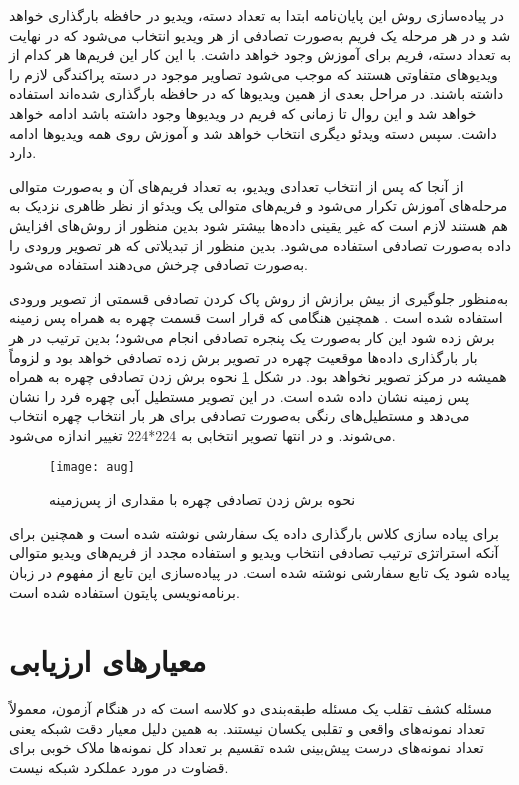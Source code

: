 در پیاده‌سازی روش این پایان‌نامه ابتدا به تعداد دسته، ویدیو در حافظه  بارگذاری خواهد شد و در هر مرحله یک فریم به‌صورت تصادفی از هر ویدیو انتخاب می‌شود که در نهایت به تعداد دسته، فریم برای آموزش وجود خواهد داشت. با این کار این فریم‌ها هر کدام از ویدیوهای متفاوتی هستند که موجب می‌شود تصاویر موجود در دسته پراکندگی لازم را داشته باشند. در مراحل بعدی از همین ویدیوها که در حافظه  بارگذاری شده‌اند استفاده خواهد شد و این روال تا زمانی که فریم در ویدیوها وجود داشته باشد ادامه خواهد داشت. سپس دسته ویدئو دیگری انتخاب خواهد شد و آموزش روی همه ویدیوها ادامه دارد. 

از آنجا که پس از انتخاب تعدادی ویدیو، به تعداد فریم‌های آن و به‌صورت متوالی مرحله‌های آموزش تکرار می‌شود و فریم‌های متوالی یک ویدئو از نظر ظاهری نزدیک به هم هستند لازم است که غیر یقینی داده‌ها بیشتر شود بدین منظور از روش‌های افزایش داده 
به‌صورت تصادفی استفاده می‌شود. بدین منظور از تبدیلاتی که هر تصویر ورودی را به‌صورت تصادفی چرخش می‌دهند استفاده می‌شود. 

به‌منظور جلوگیری از بیش برازش از روش پاک کردن تصادفی قسمتی از تصویر ورودی استفاده شده است 
\cite{zhong2020random}
. همچنین هنگامی که قرار است قسمت چهره به همراه پس زمینه برش زده شود این کار به‌صورت یک پنجره تصادفی انجام می‌شود؛ بدین ترتیب در هر بار بارگذاری داده‌ها موقعیت چهره در تصویر برش زده تصادفی خواهد بود و لزوماً همیشه در مرکز تصویر نخواهد بود.
در شکل  
\ref{fig:aug}
نحوه برش زدن تصادفی چهره به همراه پس زمینه نشان داده شده است. در این تصویر مستطیل آبی چهره فرد را نشان می‌دهد و مستطیل‌های رنگی به‌صورت تصادفی برای هر بار انتخاب چهره انتخاب می‌شوند. و در انتها تصویر انتخابی به 224*224 تغییر اندازه می‌شود.
\begin{figure}[ht]
	\centerline{\texttt{[image: aug]}}
	\caption{نحوه برش زدن تصادفی چهره با مقداری از پس‌زمینه}
	\label{fig:aug}
\end{figure}

برای پیاده سازی کلاس بارگذاری داده یک
سفارشی نوشته شده است و همچنین برای آنکه استراتژی ترتیب تصادفی انتخاب ویدیو و استفاده مجدد از فریم‌های ویدیو متوالی پیاده شود یک تابع  سفارشی نوشته شده است. در پیاده‌سازی این تابع از مفهوم  در زبان برنامه‌نویسی پایتون استفاده شده است.
\section{معیارهای ارزیابی}
مسئله کشف تقلب یک مسئله طبقه‌بندی دو کلاسه است که در هنگام آزمون، معمولاً تعداد نمونه‌های واقعی و تقلبی یکسان نیستند. به همین دلیل معیار دقت شبکه یعنی تعداد نمونه‌های درست پیش‌بینی شده تقسیم بر تعداد کل نمونه‌ها ملاک خوبی برای قضاوت در مورد عملکرد شبکه نیست. 

